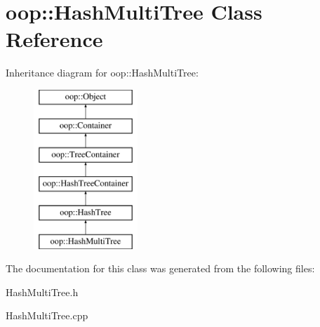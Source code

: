 \hypertarget{classoop_1_1HashMultiTree}{\section{oop\-:\-:\-Hash\-Multi\-Tree \-Class \-Reference}
\label{classoop_1_1HashMultiTree}
}
\-Inheritance diagram for oop\-:\-:\-Hash\-Multi\-Tree\-:\begin{figure}[H]
\begin{center}
\leavevmode
\includegraphics[height=6.000000cm]{classoop_1_1HashMultiTree}
\end{center}
\end{figure}


\-The documentation for this class was generated from the following files\-:\begin{DoxyCompactItemize}
\item 
\-Hash\-Multi\-Tree.\-h\item 
\-Hash\-Multi\-Tree.\-cpp\end{DoxyCompactItemize}
